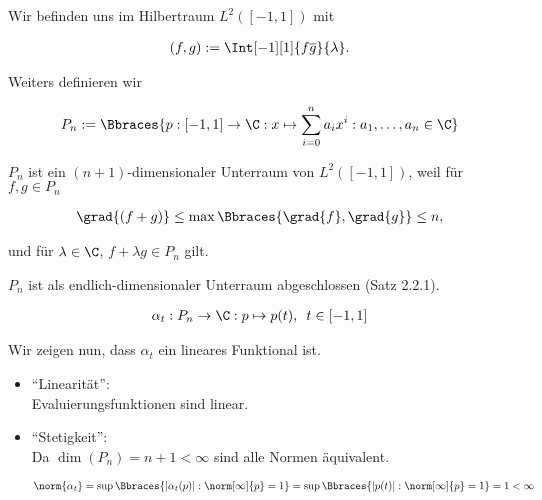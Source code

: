 \begin{solution}

Wir befinden uns im Hilbertraum $L^2([-1, 1])$ mit

\begin{align*}
  (f, g) := \Int[-1][1]{f \overline{g}}{\lambda}.
\end{align*}

Weiters definieren wir

\begin{align*}
  P_n := \Bbraces
  {
    p: [-1, 1] \to \C: x
    \mapsto \sum_{i=0}^n a_i x^i:
    a_1, \ldots, a_n \in \C
  }
\end{align*}

$P_n$ ist ein $(n+1)$-dimensionaler Unterraum von $L^2([-1, 1])$, weil für $f, g \in P_n$

\begin{align*}
  \grad{(f + g)}
  \leq
  \max \Bbraces{\grad{f}, \grad{g}}
  \leq n,
\end{align*}

und für $\lambda \in \C$, $f + \lambda g \in P_n$ gilt.


$P_n$ ist als endlich-dimensionaler Unterraum abgeschlossen (Satz 2.2.1).

\begin{align*}
  \alpha_t:
  P_n \to \C:
  p  \mapsto p(t),
  \enspace
  t \in [-1, 1]
\end{align*}

Wir zeigen nun, dass $\alpha_t$ ein lineares Funktional ist.

\begin{itemize}

  \item
  \enquote{Linearität}: \\

  Evaluierungsfunktionen sind linear.

  \item
  \enquote{Stetigkeit}: \\

  Da $\dim(P_n) = n + 1 < \infty$ sind alle Normen äquivalent.

  \begin{align*}
    \norm{\alpha_t}
    =
    \sup \Bbraces
    {
      |\alpha_t(p)|:
      \norm[\infty]{p} = 1
    }
    =
    \sup \Bbraces
    {
      |p(t)|:
      \norm[\infty]{p} = 1
    }
    = 1 < \infty
  \end{align*}


\end{itemize}
\end{solution}
